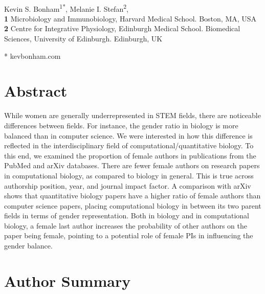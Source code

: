 \documentclass[10pt,letterpaper]{article}
\date{}
\begin{document}
\vspace*{0.2in}
\linenumbers
\begin{flushleft}
{\Large
\textbf{}
}
\newline
\\
Kevin S. Bonham\textsuperscript{1*},
Melanie I. Stefan\textsuperscript{2},
\\
\bigskip
\textbf{1} Microbiology and Immunobiology, Harvard Medical School. Boston, MA, USA
\\
\textbf{2} {Centre for Integrative Physiology, Edinburgh Medical School. Biomedical Sciences, University of Edinburgh. Edinburgh, UK}
\\
\bigskip

* kevbonham\@gmail.com

\section*{Abstract}
While women are generally underrepresented in STEM fields, there are noticeable differences between fields. For instance, the gender ratio in biology is more balanced than in computer science. We were interested in how this difference is reflected in the interdisciplinary field of computational/quantitative biology. To this end, we examined the proportion of female authors in publications from the PubMed and arXiv databases. There are fewer female authors on research papers in computational biology, as compared to biology in general. This is true across authorship position, year, and journal impact factor. A comparison with arXiv shows that quantitative biology papers have a higher ratio of female authors than computer science papers, placing computational biology in between its two parent fields in terms of gender representation. Both in biology and in computational biology, a female last author increases the probability of other authors on the paper being female, pointing to a potential role of female PIs in influencing the gender balance.

\section*{Author Summary}


\end{flushleft}
\end{document}
